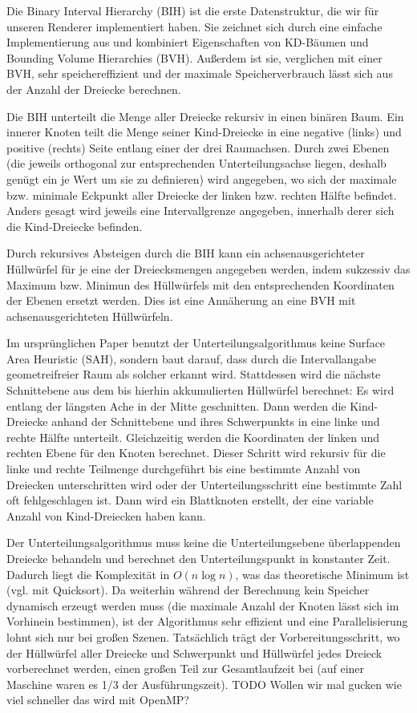 Die Binary Interval Hierarchy (BIH) ist die erste Datenstruktur, die wir für unseren Renderer implementiert haben. Sie zeichnet sich durch eine einfache Implementierung aus und kombiniert Eigenschaften von KD-Bäumen und Bounding Volume Hierarchies (BVH). Außerdem ist sie, verglichen mit einer BVH, sehr speichereffizient und der maximale Speicherverbrauch lässt sich aus der Anzahl der Dreiecke berechnen.

Die BIH unterteilt die Menge aller Dreiecke rekursiv in einen binären Baum. Ein innerer Knoten teilt die Menge seiner Kind-Dreiecke in eine negative (links) und positive (rechts) Seite entlang einer der drei Raumachsen. Durch zwei Ebenen (die jeweils orthogonal zur entsprechenden Unterteilungsachse liegen, deshalb genügt ein je  Wert um sie zu definieren) wird angegeben, wo sich der maximale bzw. minimale Eckpunkt aller Dreiecke der linken bzw. rechten Hälfte befindet. Anders gesagt wird jeweils eine Intervallgrenze angegeben, innerhalb derer sich die Kind-Dreiecke befinden.

Durch rekursives Absteigen durch die BIH kann ein achsenausgerichteter Hüllwürfel für je eine der Dreiecksmengen angegeben werden, indem sukzessiv das Maximum bzw. Minimun des Hüllwürfels mit den entsprechenden Koordinaten der Ebenen ersetzt werden. Dies ist eine Annäherung an eine BVH mit achsenausgerichteten Hüllwürfeln.

Im ursprünglichen Paper benutzt der Unterteilungsalgorithmus keine Surface Area Heuristic (SAH), sondern baut darauf, dass durch die Intervallangabe geometreifreier Raum als solcher erkannt wird. Stattdessen wird die nächste Schnittebene aus dem bis hierhin akkumulierten Hüllwürfel berechnet: Es wird entlang der längsten Ache in der Mitte geschnitten. Dann werden die Kind-Dreiecke anhand der Schnittebene und ihres Schwerpunkts in eine linke und rechte Hälfte unterteilt. Gleichzeitig werden die Koordinaten der linken und rechten Ebene für den Knoten berechnet. Dieser Schritt wird rekursiv für die linke und rechte Teilmenge durchgeführt bis eine bestimmte Anzahl von Dreiecken unterschritten wird oder der Unterteilungsschritt eine bestimmte Zahl oft fehlgeschlagen ist. Dann wird ein Blattknoten erstellt, der eine variable Anzahl von Kind-Dreiecken haben kann.

Der Unterteilungsalgorithmus muss keine die Unterteilungsebene überlappenden Dreiecke behandeln und berechnet den Unterteilungspunkt in konstanter Zeit. Dadurch liegt die Komplexität in $O(n \log n)$, was das theoretische Minimum ist (vgl. mit Quicksort). Da weiterhin während der Berechnung kein Speicher dynamisch erzeugt werden muss (die maximale Anzahl der Knoten lässt sich im Vorhinein bestimmen), ist der Algorithmus sehr effizient und eine Parallelisierung lohnt sich nur bei großen Szenen. Tatsächlich trägt der Vorbereitungsschritt, wo der Hüllwürfel aller Dreiecke und Schwerpunkt und Hüllwürfel jedes Dreieck vorberechnet werden, einen großen Teil zur Gesamtlaufzeit bei (auf einer Maschine waren es 1/3 der Ausführungszeit). TODO Wollen wir mal gucken wie viel schneller das wird mit OpenMP?

